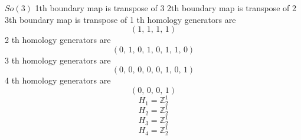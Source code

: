 \documentclass[8pt]{article}\usepackage{amsmath}
\newcommand{\Z}{\mathbb{Z}}
\begin{document}
 \( So( 3 )\)
 1th boundary map is  transpose of 3
\newline
 2th boundary map is  transpose of 2
\newline
 3th boundary map is  transpose of 1
 th homology generators are 
 \[ \left(1,\,1,\,1,\,1\right) \]
 2 th homology generators are 
 \[ \left(0,\,1,\,0,\,1,\,0,\,1,\,1,\,0\right) \]
 3 th homology generators are 
 \[ \left(0,\,0,\,0,\,0,\,0,\,1,\,0,\,1\right) \]
 4 th homology generators are 
 \[ \left(0,\,0,\,0,\,1\right) \]
 \[H_1 = \Z_2^1 \]
 \[H_2 = \Z_2^1 \]
 \[H_3 = \Z_2^1 \]
 \[H_4 = \Z_2^1 \]
 
\end{document}
